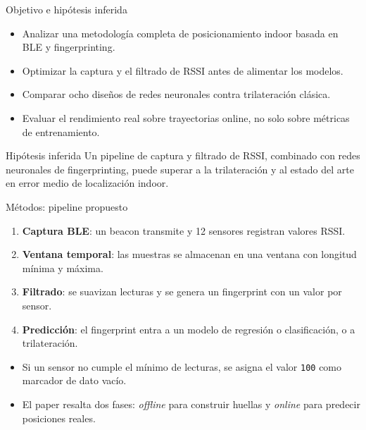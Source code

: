 \documentclass[aspectratio=169]{beamer}
\begin{document}
\begin{frame}{Objetivo e hip\'otesis inferida}
  \begin{itemize}
    \item Analizar una metodolog\'ia completa de posicionamiento indoor basada en BLE y fingerprinting.
    \item Optimizar la captura y el filtrado de RSSI antes de alimentar los modelos.
    \item Comparar ocho dise\~nos de redes neuronales contra trilateraci\'on cl\'asica.
    \item Evaluar el rendimiento real sobre trayectorias online, no solo sobre m\'etricas de entrenamiento.
  \end{itemize}
  \vspace{0.3cm}
  \begin{block}{Hip\'otesis inferida}
    Un pipeline de captura y filtrado de RSSI, combinado con redes neuronales de fingerprinting, puede superar a la trilateraci\'on y al estado del arte en error medio de localizaci\'on indoor.
  \end{block}
\end{frame}

\begin{frame}{M\'etodos: pipeline propuesto}
  \begin{enumerate}
    \item \textbf{Captura BLE}: un beacon transmite y 12 sensores registran valores RSSI.
    \item \textbf{Ventana temporal}: las muestras se almacenan en una ventana con longitud m\'inima y m\'axima.
    \item \textbf{Filtrado}: se suavizan lecturas y se genera un fingerprint con un valor por sensor.
    \item \textbf{Predicci\'on}: el fingerprint entra a un modelo de regresi\'on o clasificaci\'on, o a trilateraci\'on.
  \end{enumerate}
  \vspace{0.2cm}
  \begin{itemize}
    \item Si un sensor no cumple el m\'inimo de lecturas, se asigna el valor \texttt{100} como marcador de dato vac\'io.
    \item El paper resalta dos fases: \textit{offline} para construir huellas y \textit{online} para predecir posiciones reales.
  \end{itemize}
\end{frame}
\end{document}
